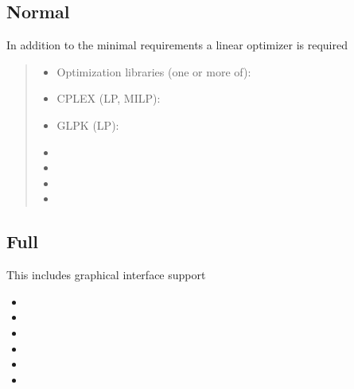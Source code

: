 \documentclass[letterpaper,10pt,english]{sphinxmanual}
\begin{document}
\subsection{Normal}
\label{\detokenize{install_doc:normal}}
\sphinxAtStartPar
In addition to the minimal requirements a linear optimizer is required
\begin{quote}
\begin{itemize}
\item {} 
\sphinxAtStartPar
Optimization libraries (one or more of):

\end{itemize}
\begin{itemize}
\item {} 
\sphinxAtStartPar
CPLEX (LP, MILP): 

\item {} 
\sphinxAtStartPar
GLPK  (LP): 

\end{itemize}
\begin{itemize}
\item {} 
\sphinxAtStartPar
{}

\item {} 
\sphinxAtStartPar
{}

\item {} 
\sphinxAtStartPar
{}

\item {} 
\sphinxAtStartPar
{}

\end{itemize}
\end{quote}


\subsection{Full}
\label{\detokenize{install_doc:full}}
\sphinxAtStartPar
This includes graphical interface support
\begin{itemize}
\item {} 
\sphinxAtStartPar
{}

\item {} 
\sphinxAtStartPar
{}

\item {} 
\sphinxAtStartPar
{}

\item {} 
\sphinxAtStartPar
{}

\item {} 
\sphinxAtStartPar
{}

\item {} 
\sphinxAtStartPar
{}

\end{itemize}
\end{document}

